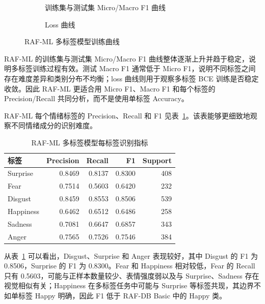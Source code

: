 \documentclass[UTF8,a4paper,12pt]{ctexart}
\newcommand{\figplaceholder}[1]{%
  \begin{center}
    \fbox{\parbox{0.78\textwidth}{\centering #1}}
  \end{center}
}
\begin{document}
\begin{figure}[H]
  \centering
  \begin{subfigure}{0.48\textwidth}
    \centering
    \figplaceholder{\rule{0pt}{1.2em}}
    \caption{训练集与测试集 Micro/Macro F1 曲线}
  \end{subfigure}
  \hfill
  \begin{subfigure}{0.48\textwidth}
    \centering
    \figplaceholder{\rule{0pt}{1.2em}}
    \caption{Loss 曲线}
  \end{subfigure}
  \caption{RAF-ML 多标签模型训练曲线}
  \label{fig:rafml_f1_curve_in_results}
\end{figure}

RAF-ML 的训练集与测试集 Micro/Macro F1 曲线整体逐渐上升并趋于稳定，说明多标签训练过程有效。测试 Macro F1 通常低于 Micro F1，说明不同标签之间存在难度差异和类别分布不均衡；loss 曲线则用于观察多标签 BCE 训练是否稳定收敛。因此 RAF-ML 更适合用 Micro F1、Macro F1 和每个标签的 Precision/Recall 共同分析，而不是使用单标签 Accuracy。

RAF-ML 每个情绪标签的 Precision、Recall 和 F1 见表~\ref{tab:rafml_per_label}。该表能够更细致地观察不同情绪成分的识别难度。

\begin{table}[H]
  \centering
  \caption{RAF-ML 多标签模型每标签识别指标}
  \label{tab:rafml_per_label}
  \small
  \setlength{\tabcolsep}{6pt}
  \begin{tabular}{lrrrr}
    \toprule
    标签 & Precision & Recall & F1 & Support \\
    \midrule
    Surprise & 0.8469 & 0.8137 & 0.8300 & 408 \\
    Fear & 0.7514 & 0.5603 & 0.6420 & 232 \\
    Disgust & 0.8459 & 0.8553 & 0.8506 & 539 \\
    Happiness & 0.6462 & 0.6512 & 0.6486 & 258 \\
    Sadness & 0.7081 & 0.6647 & 0.6857 & 343 \\
    Anger & 0.7565 & 0.7526 & 0.7546 & 384 \\
    \bottomrule
  \end{tabular}
\end{table}

从表~\ref{tab:rafml_per_label} 可以看出，Disgust、Surprise 和 Anger 表现较好，其中 Disgust 的 F1 为 0.8506，Surprise 的 F1 为 0.8300。Fear 和 Happiness 相对较低，Fear 的 Recall 只有 0.5603，可能与正样本数量较少、表情强度弱以及与 Surprise、Sadness 存在视觉相似有关；Happiness 在多标签任务中可能与 Surprise 等标签共现，其边界不如单标签 Happy 明确，因此 F1 低于 RAF-DB Basic 中的 Happy 类。
\end{document}
